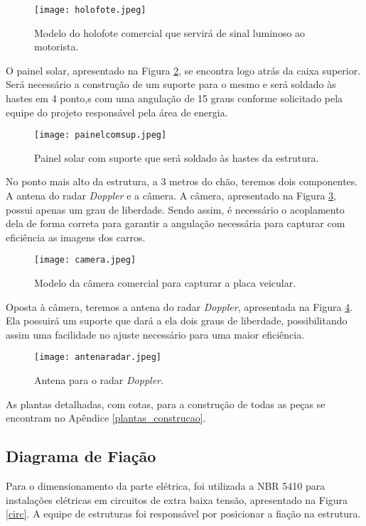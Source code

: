 \begin{figure}[h]
	\centering
    \texttt{[image: holofote.jpeg]}
    \caption{Modelo do holofote comercial que servirá de sinal luminoso ao motorista.}
    \label{holof}
\end{figure}

O painel solar, apresentado na Figura \ref{painelsol}, se encontra logo atrás da caixa superior. Será necessário a construção de um suporte para o mesmo e será soldado às hastes em 4 ponto,s com uma angulação de 15 graus conforme solicitado pela equipe do projeto responsável pela área de energia. 
\newpage
\begin{figure}[h]
	\centering
    \texttt{[image: painelcomsup.jpeg]}
    \caption{Painel solar com suporte que será soldado às hastes da estrutura.}
    \label{painelsol}
\end{figure}

No ponto mais alto da estrutura, a 3 metros do chão, teremos dois componentes. A antena do radar \textit{Doppler} e a câmera. A câmera, apresentado na Figura \ref{camera}, possui apenas um grau de liberdade. Sendo assim, é necessário o acoplamento dela de forma correta para garantir a angulação necessária para capturar com eficiência as imagens dos carros. 

\begin{figure}[h]
	\centering
    \texttt{[image: camera.jpeg]}
    \caption{Modelo da câmera comercial para capturar a placa veicular.}
    \label{camera}
\end{figure}

Oposta à câmera, teremos a antena do radar \textit{Doppler}, apresentada na Figura \ref{antrad}. Ela possuirá um suporte que dará a ela dois graus de liberdade, possibilitando assim uma facilidade no ajuste necessário para uma maior eficiência. 
\newpage
\begin{figure}[h]
	\centering
    \texttt{[image: antenaradar.jpeg]}
    \caption{Antena para o radar \textit{Doppler}.}
    \label{antrad}
\end{figure}

As plantas detalhadas, com cotas, para a construção de todas as peças se encontram no Apêndice \ref{plantas_construcao}. 

\subsection{Diagrama de Fiação}

Para o dimensionamento da parte elétrica, foi utilizada a NBR 5410 \cite{protecao} para instalações elétricas em circuitos de extra baixa tensão, apresentado na Figura \ref{circ}. A equipe de estruturas foi responsável por posicionar a fiação na estrutura. 

